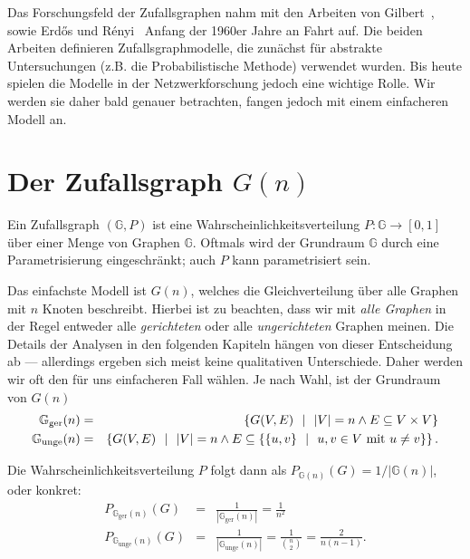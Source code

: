 Das Forschungsfeld der Zufallsgraphen nahm mit den Arbeiten von Gilbert~\cite{gilbert_1959}, sowie Erd\H{o}s und R\'enyi~\cite{erdos_renyi_1960} Anfang der 1960er Jahre an Fahrt auf.
Die beiden Arbeiten definieren Zufallsgraphmodelle, die zunächst für abstrakte Untersuchungen (z.B. die Probabilistische Methode) verwendet wurden.
Bis heute spielen die Modelle in der Netzwerkforschung jedoch eine wichtige Rolle.
Wir werden sie daher bald genauer betrachten, fangen jedoch mit einem einfacheren Modell an.

\section{Der Zufallsgraph $G(n)$}
Ein Zufallsgraph $(\mathbb G, P)$ ist eine Wahrscheinlichkeitsverteilung $P\colon \mathbb G \to [0, 1]$ über einer Menge von Graphen $\mathbb G$.
Oftmals wird der Grundraum $\mathbb G$ durch eine Parametrisierung eingeschränkt; auch $P$ kann parametrisiert sein.

Das  einfachste Modell ist $G(n)$, welches die Gleichverteilung über alle Graphen mit $n$ Knoten beschreibt.
Hierbei ist zu beachten, dass wir mit \emph{alle Graphen} in der Regel entweder alle \emph{gerichteten} oder alle \emph{ungerichteten} Graphen meinen.
Die Details der Analysen in den folgenden Kapiteln hängen von dieser Entscheidung ab --- allerdings ergeben sich meist keine qualitativen Unterschiede.
Daher werden wir oft den für uns einfacheren Fall wählen.
Je nach Wahl, ist der Grundraum von $G(n)$
\begin{eqnarray}
    \mathbb G_\text{ger}(n) &=&
    \left\{ G(V,E) \ \ \middle|\ \ |V| = n \land E \subseteq V \times V \right\}\\
    \mathbb G_\text{unge}(n) &=&
    \left\{ G(V,E) \ \ \middle|\ \ |V| = n \land  E \subseteq \left\{ \left\{u,v\right\} \ \ \middle|\ \ u,v \in V \text{ mit } u \ne v \right\} \right\}.
\end{eqnarray}

\noindent Die Wahrscheinlichkeitsverteilung $P$ folgt dann als $P_{\mathbb G(n)}(G) = 1 / | \mathbb G(n) |$, oder konkret:
\begin{eqnarray}
    P_{\mathbb G_\text{ger}(n)}(G) &=& \frac{1}{| \mathbb G_\text{ger}(n) |} = \frac{1}{n^2}\\
    P_{\mathbb G_\text{unge}(n)}(G) &=& \frac{1}{| \mathbb G_\text{unge}(n) |} = \frac{1}{\binom n 2} = \frac{2}{n(n-1)}.
\end{eqnarray}

